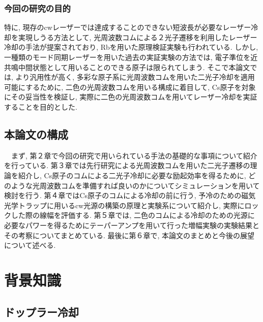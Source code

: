 \documentclass[uplatex, dvipdfmx, a4paper, report, papersize, 11pt]{jsbook}
\begin{document}
\subsection{今回の研究の目的}
特に, 現存のcwレーザーでは達成することのできない短波長が必要なレーザー冷却を実現しうる方法として, 光周波数コムによる２光子遷移を利用したレーザー冷却の手法が提案されており, Rbを用いた原理検証実験も行われている\cite{PhysRevX.6.041004, PhysRevA.73.063407}. しかし, 一種類のモード同期レーザーを用いた過去の実証実験の方法では, 電子準位を近共鳴中間状態として用いることのできる原子は限られてしまう. そこで本論文では, より汎用性が高く, 多彩な原子系に光周波数コムを用いた二光子冷却を適用可能にするために, 二色の光周波数コムを用いる構成に着目して, Cs原子を対象にその妥当性を検証し, 実際に二色の光周波数コムを用いてレーザー冷却を実証することを目的とした. \\

\section{本論文の構成}
　まず, 第２章で今回の研究で用いられている手法の基礎的な事項について紹介を行っている. 第３章では先行研究による光周波数コムを用いた二光子遷移の理論を紹介し, Cs原子のコムによる二光子冷却に必要な励起効率を得るために, どのような光周波数コムを準備すれば良いのかについてシミュレーションを用いて検討を行う. 第４章ではCs原子のコムによる冷却の前に行う, 予冷のための磁気光学トラップに用いるcw光源の構築の原理と実験系について紹介し, 実際にロックした際の線幅を評価する. 第５章では, 二色のコムによる冷却のための光源に必要なパワーを得るためにテーパーアンプを用いて行った増幅実験の実験結果とその考察についてまとめている. 最後に第６章で, 本論文のまとめと今後の展望について述べる.
\newpage

\chapter{背景知識}

\section{ドップラー冷却}
\end{document}

